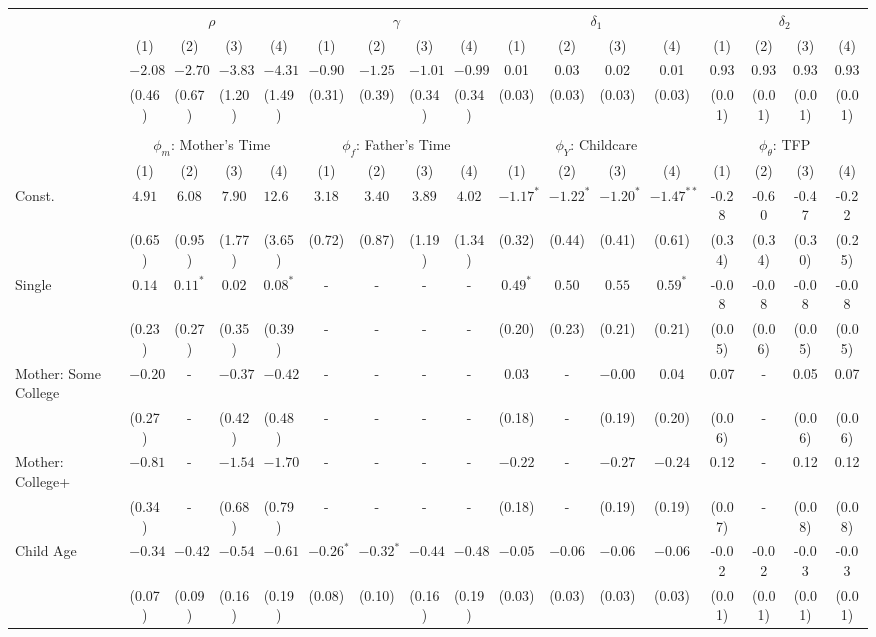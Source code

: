 \begin{tabular}{lcccccccccccccccc}\\\toprule
 & \multicolumn{4}{c}{$\rho$} & \multicolumn{4}{c}{$\gamma$} & \multicolumn{4}{c}{$\delta_{1}$} & \multicolumn{4}{c}{$\delta_{2}$} \\
&(1)&(2)&(3)&(4)&(1)&(2)&(3)&(4)&(1)&(2)&(3)&(4)&(1)&(2)&(3)&(4)\\\cmidrule(r){2-5}\cmidrule(r){6-9}\cmidrule(r){10-13}\cmidrule(r){14-17}
&$-2.08$&$-2.70$&$-3.83$&$-4.31$&$-0.90$&$-1.25$&$-1.01$&$-0.99$&0.01&0.03&0.02&0.01&0.93&0.93&0.93&0.93\\
&(0.46)&(0.67)&(1.20)&(1.49)&(0.31)&(0.39)&(0.34)&(0.34)&(0.03)&(0.03)&(0.03)&(0.03)&(0.01)&(0.01)&(0.01)&(0.01)\\
&&&&&&&&&&&&&&&&\\
 & \multicolumn{4}{c}{$\phi_{m}$: Mother's Time} & \multicolumn{4}{c}{$\phi_{f}$: Father's Time} & \multicolumn{4}{c}{$\phi_{Y}$: Childcare} & \multicolumn{4}{c}{$\phi_{\theta}$: TFP} \\
&(1)&(2)&(3)&(4)&(1)&(2)&(3)&(4)&(1)&(2)&(3)&(4)&(1)&(2)&(3)&(4)\\\cmidrule(r){2-5}\cmidrule(r){6-9}\cmidrule(r){10-13}\cmidrule(r){14-17}
Const.&$4.91$&$6.08$&$7.90$&$12.60$&$3.18$&$3.40$&$3.89$&$4.02$&$-1.17^{*}$&$-1.22^{*}$&$-1.20^{*}$&$-1.47^{**}$&-0.28&-0.60&-0.47&-0.22\\
&(0.65)&(0.95)&(1.77)&(3.65)&(0.72)&(0.87)&(1.19)&(1.34)&(0.32)&(0.44)&(0.41)&(0.61)&(0.34)&(0.34)&(0.30)&(0.25)\\
Single&$0.14$&$0.11^{*}$&$0.02$&$0.08^{*}$&-&-&-&-&$0.49^{*}$&$0.50$&$0.55$&$0.59^{*}$&-0.08&-0.08&-0.08&-0.08\\
&(0.23)&(0.27)&(0.35)&(0.39)&-&-&-&-&(0.20)&(0.23)&(0.21)&(0.21)&(0.05)&(0.06)&(0.05)&(0.05)\\
Mother: Some College&$-0.20$&-&$-0.37$&$-0.42$&-&-&-&-&$0.03$&-&$-0.00$&$0.04$&0.07&-&0.05&0.07\\
&(0.27)&-&(0.42)&(0.48)&-&-&-&-&(0.18)&-&(0.19)&(0.20)&(0.06)&-&(0.06)&(0.06)\\
Mother: College+&$-0.81$&-&$-1.54$&$-1.70$&-&-&-&-&$-0.22$&-&$-0.27$&$-0.24$&0.12&-&0.12&0.12\\
&(0.34)&-&(0.68)&(0.79)&-&-&-&-&(0.18)&-&(0.19)&(0.19)&(0.07)&-&(0.08)&(0.08)\\
Child Age&$-0.34$&$-0.42$&$-0.54$&$-0.61$&$-0.26^{*}$&$-0.32^{*}$&$-0.44$&$-0.48$&$-0.05$&$-0.06$&$-0.06$&$-0.06$&-0.02&-0.02&-0.03&-0.03\\
&(0.07)&(0.09)&(0.16)&(0.19)&(0.08)&(0.10)&(0.16)&(0.19)&(0.03)&(0.03)&(0.03)&(0.03)&(0.01)&(0.01)&(0.01)&(0.01)\\

\end{tabular}
